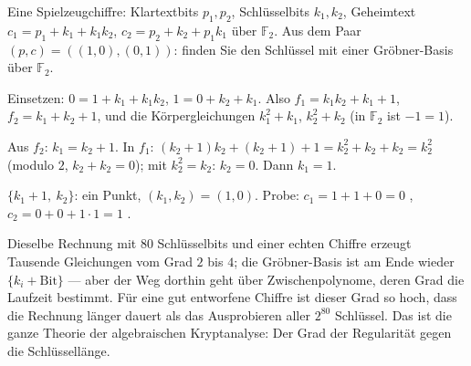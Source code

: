 \begin{aufgabe}
Eine Spielzeugchiffre: Klartextbits $p_1, p_2$, Schlüsselbits $k_1, k_2$, Geheimtext $c_1 = p_1 + k_1 + k_1k_2$, $c_2 = p_2 + k_2 + p_1k_1$ über $\mathbb F_2$. Aus dem Paar $(p, c) = ((1, 0), (0, 1))$: finden Sie den Schlüssel mit einer Gröbner-Basis über $\mathbb F_2$.

\loesung
{}
Einsetzen: $0 = 1 + k_1 + k_1k_2$, $1 = 0 + k_2 + k_1$. Also $f_1 = k_1k_2 + k_1 + 1$, $f_2 = k_1 + k_2 + 1$, und die Körpergleichungen $k_1^{2} + k_1$, $k_2^{2} + k_2$ (in $\mathbb F_2$ ist $-1 = 1$).

Aus $f_2$: $k_1 = k_2 + 1$. In $f_1$: $(k_2 + 1)k_2 + (k_2 + 1) + 1 = k_2^{2} + k_2 + k_2 = k_2^{2}$ (modulo $2$, $k_2 + k_2 = 0$); mit $k_2^{2} = k_2$: $k_2 = 0$. Dann $k_1 = 1$.

$\{k_1 + 1,\ k_2\}$: ein Punkt, $(k_1, k_2) = (1, 0)$. Probe: $c_1 = 1 + 1 + 0 = 0$ \checkmark, $c_2 = 0 + 0 + 1\cdot1 = 1$ \checkmark.

Dieselbe Rechnung mit $80$ Schlüsselbits und einer echten Chiffre erzeugt Tausende Gleichungen vom Grad $2$ bis $4$; die Gröbner-Basis ist am Ende wieder $\{k_i + \text{Bit}\}$ --- aber der Weg dorthin geht über Zwischenpolynome, deren Grad die Laufzeit bestimmt. Für eine gut entworfene Chiffre ist dieser Grad so hoch, dass die Rechnung länger dauert als das Ausprobieren aller $2^{80}$ Schlüssel. Das ist die ganze Theorie der algebraischen Kryptanalyse: Der Grad der Regularität gegen die Schlüssellänge.

\begin{center}
\begin{minipage}{0.88\textwidth}
\end{minipage}
\end{center}
\end{aufgabe}

